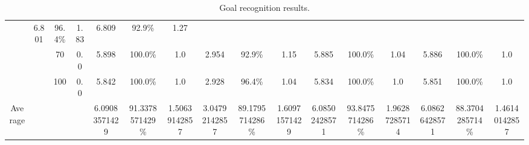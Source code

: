 \documentclass[letterpaper]{article}
\begin{document}
\begin{table*}[]
\begin{tabular}{|c|c|cc|ccc|ccc|ccc|ccc|}
		& 6.801 & 96.4\% & 1.83 	 

		& 6.809 & 92.9\% & 1.27 	 

	\\ & & 70	 & 0.0

		& 5.898 & 100.0\% & 1.0 	 

		& 2.954 & 92.9\% & 1.15 	 

		& 5.885 & 100.0\% & 1.04 	 

		& 5.886 & 100.0\% & 1.0 	 

	\\ & & 100	 & 0.0

		& 5.842 & 100.0\% & 1.0 	 

		& 2.928 & 96.4\% & 1.04 	 

		& 5.834 & 100.0\% & 1.0 	 

		& 5.851 & 100.0\% & 1.0 	 
 \\ \hline

Average & & & & 6.09083571429 & 91.3378571429\% & 1.50639142857 & 3.04792142857 & 89.1795714286\% & 1.60971571429 & 6.08502428571 & 93.8475714286\% & 1.96287285714 & 6.08626428571 & 88.3704285714\% & 1.46140142857 
 
\\ \hline

\end{tabular}
\caption{Goal recognition results.}
\label{tab:goalRecognitionResults}
\end{table*}
\end{document}
